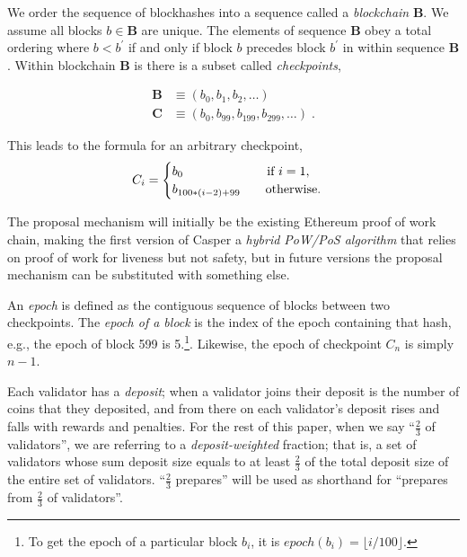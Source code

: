 \documentclass[12pt]{article}
\begin{document}
We order the sequence of blockhashes into a sequence called a \emph{blockchain} $\mathbf{B}$.  We assume all blocks $b \in \mathbf{B}$ are unique.  The elements of sequence $\mathbf{B}$ obey a total ordering where $b < b^\prime$ if and only if block $b$ precedes block $b^\prime$ in within sequence $\mathbf{B}$. Within blockchain $\mathbf{B}$ is there is a subset called \emph{checkpoints},

\begin{equation}
\begin{split}
    \mathbf{B} &\equiv \left( b_0, b_1, b_2, \ldots \right) \\
    \mathbf{C} &\equiv \left( b_0, b_{99}, b_{199}, b_{299}, \ldots \right) \; .
\end{split}
\end{equation}

This leads to the formula for an arbitrary checkpoint,
\begin{equation}
    C_i = \begin{cases}
     b_0 \qquad \qquad \qquad\ \  \textnormal{if } i = 1, \\
     b_{ 100*(i-2) + 99 } \qquad \textnormal{otherwise.}
     \end{cases}
\end{equation}

The proposal mechanism will initially be the existing Ethereum proof of work chain, making the first version of Casper a \textit{hybrid PoW/PoS algorithm} that relies on proof of work for liveness but not safety, but in future versions the proposal mechanism can be substituted with something else.

An \emph{epoch} is defined as the contiguous sequence of blocks between two checkpoints.  The \textit{epoch of a block} is the index of the epoch containing that hash, e.g., the epoch of block 599 is 5.\footnote{To get the epoch of a particular block $b_i$, it is $epoch(b_i) = \lfloor i / 100 \rfloor$.}. Likewise, the epoch of checkpoint $C_n$ is simply $n - 1$.



Each validator has a \emph{deposit}; when a validator joins their deposit is the number of coins that they deposited, and from there on each validator's deposit rises and falls with rewards and penalties. For the rest of this paper, when we say ``$\frac{2}{3}$ of validators'', we are referring to a \emph{deposit-weighted} fraction; that is, a set of validators whose sum deposit size equals to at least $\frac{2}{3}$ of the total deposit size of the entire set of validators. ``$\frac{2}{3}$ prepares'' will be used as shorthand for ``prepares from $\frac{2}{3}$ of validators''.
\end{document}
